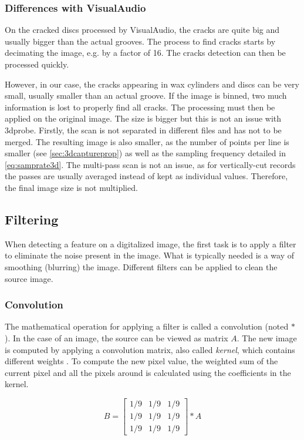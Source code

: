 \subsubsection{Differences with VisualAudio}

On the cracked discs processed by VisualAudio, the cracks are quite big and usually bigger than the actual grooves. The process to find cracks starts by decimating the image, e.g. by a factor of 16. The cracks detection can then be processed quickly.

However, in our case, the cracks appearing in wax cylinders and discs can be very small, usually smaller than an actual groove. If the image is binned, two much information is lost to properly find all cracks. The processing must then be applied on the original image. The size is bigger but this is not an issue with \gls{3dprobe}. Firstly, the scan is not separated in different files and has not to be merged. The resulting image is also smaller, as the number of points per line is smaller (see \autoref{sec:3dcaptureprop}) as well as the sampling frequency detailed in \eqref{eq:samprate3d}. The multi-pass scan is not an issue, as for vertically-cut records the passes are usually averaged instead of kept as individual values. Therefore, the final image size is not multiplied.

\subsection{Filtering}

When detecting a feature on a digitalized image, the first task is to apply a filter to eliminate the noise present in the image. What is typically needed is a way of smoothing (blurring) the image. Different filters can be applied to clean the source image.

\subsubsection{Convolution}

The mathematical operation for applying a filter is called a convolution (noted $\ast$). In the case of an image, the source can be viewed as matrix $A$. The new image is computed by applying a convolution matrix, also called \emph{kernel}, which contains different weights . To compute the new pixel value, the weighted sum of the current pixel and all the pixels around is calculated using the coefficients in the kernel.

\begin{equation}
\label{eq:convolsimple}
B =
\begin{bmatrix}
1/9 & 1/9 & 1/9 \\
1/9 & 1/9 & 1/9 \\
1/9 & 1/9 & 1/9
\end{bmatrix}
\ast A
\end{equation}

